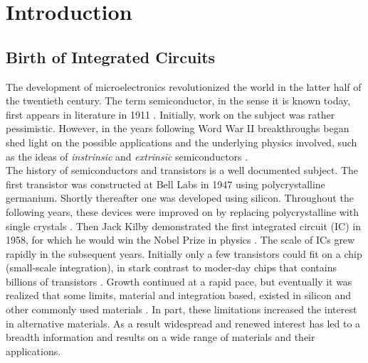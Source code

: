 \chapter{Introduction}\label{sec:intro}
\section{Birth of Integrated Circuits}
The development of microelectronics revolutionized the world in the latter half of the twentieth century. The term semiconductor, in the sense it is known today, first appears in literature in 1911 \cite{Koenigsberger_AnnalenDerPhysik1911}. Initially, work on the subject was rather pessimistic. However, in the years following Word War II breakthroughs began shed light on the possible applications and the underlying physics involved, such as the ideas of \emph{instrinsic} and \emph{extrinsic} semiconductors \cite{Busch_EuroJournPhys1989,Lark_AAAS1954,Wilson_Royal1931a,Wilson_Royal1931b}. \\

\noindent The history of semiconductors and transistors is a well documented subject. The first transistor was constructed at Bell Labs in 1947 using polycrystalline germanium. Shortly thereafter one was developed using silicon. Throughout the following years, these devices were improved on by replacing polycrystalline with single crystals \cite{Neamen_Semiconductor_Physics2003}. Then Jack Kilby demonstrated the first integrated circuit (IC) in 1958, for which he would win the Nobel Prize in physics \cite{Lukasiak_JorunTelcomm2010, Kilby_Patent1959}. The scale of ICs grew rapidly in the subsequent years. Initially only a few transistors could fit on a chip (small-scale integration), in stark contrast to moder-day chips that contains billions of transistors \cite{Moore_Electronics1965, Clarke_EEtimes2005}. Growth continued at a rapid pace, but eventually it was realized that some limits, material and integration based, existed in silicon and other commonly used materials \cite{Meindl_Science2001, Schulz_Nature1999}. In part, these limitations increased the interest in alternative materials. As a result widespread and renewed interest has led to a breadth information and results on a wide range of materials and their applications.

